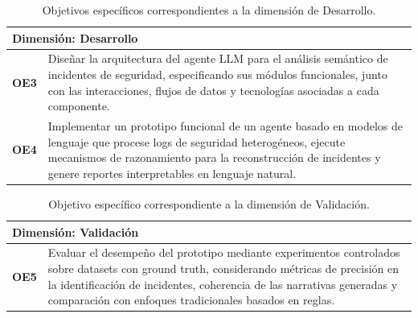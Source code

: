 \vspace{0.4cm}

\begin{table}[H]
\centering
\renewcommand{\arraystretch}{1.6}
\begin{tabularx}{\textwidth}{| l | X |}
  \hline
  \multicolumn{2}{|l|}{\textbf{Dimensión: Desarrollo}} \\
  \hline
  \textbf{OE3} &
  Diseñar la arquitectura del agente LLM para el análisis semántico 
  de incidentes de seguridad, especificando sus módulos funcionales, junto con las interacciones, flujos de datos y tecnologías asociadas a cada componente.\\
  \hline
  \textbf{OE4} &
  Implementar un prototipo funcional de un agente basado en modelos de lenguaje que procese logs de seguridad heterogéneos, ejecute mecanismos de razonamiento para la reconstrucción de incidentes y genere reportes interpretables en lenguaje natural.\\
  \hline
\end{tabularx}
\caption{Objetivos específicos correspondientes a la dimensión de Desarrollo.}
\label{tab:obj_desarrollo}
\end{table}

\vspace{0.4cm}

\begin{table}[H]
\centering
\renewcommand{\arraystretch}{1.6}
\begin{tabularx}{\textwidth}{| l | X |}
  \hline
  \multicolumn{2}{|l|}{\textbf{Dimensión: Validación}} \\
  \hline
  \textbf{OE5} &
  Evaluar el desempeño del prototipo mediante experimentos controlados sobre datasets con ground truth, considerando métricas de precisión en la identificación de incidentes, coherencia de las narrativas generadas y comparación con enfoques tradicionales basados en reglas.\\
  \hline
\end{tabularx}
\caption{Objetivo específico correspondiente a la dimensión de Validación.}
\label{tab:obj_validacion}
\end{table}